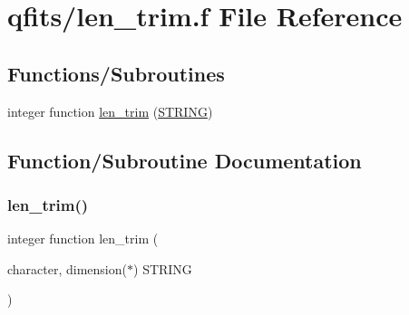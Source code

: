 \hypertarget{qfits_2len__trim_8f}{}\section{qfits/len\+\_\+trim.f File Reference}
\label{qfits_2len__trim_8f}
\subsection*{Functions/\+Subroutines}
\begin{DoxyCompactItemize}
\item 
integer function \hyperlink{qfits_2len__trim_8f_a16b24aa64df0a5da0c57510698b7ba8e}{len\+\_\+trim} (\hyperlink{eval__tab_8h_a0f4d394a3ab4e09bff60f714c66dc5ee}{S\+T\+R\+I\+NG})
\end{DoxyCompactItemize}


\subsection{Function/\+Subroutine Documentation}
\mbox{\label{qfits_2len__trim_8f_a16b24aa64df0a5da0c57510698b7ba8e}} 
\subsubsection{\texorpdfstring{len\+\_\+trim()}{len\_trim()}}
{\footnotesize\ttfamily integer function len\+\_\+trim (\begin{DoxyParamCaption}\item[{character, dimension($\ast$)}]{S\+T\+R\+I\+NG }\end{DoxyParamCaption})}

